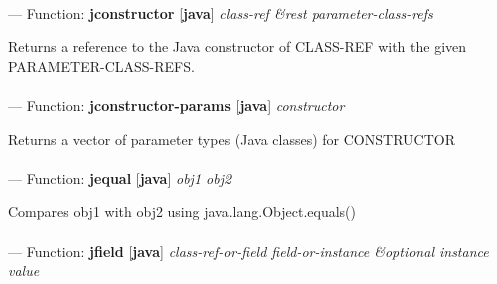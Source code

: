 \paragraph{}
\label{JAVA:JCONSTRUCTOR}
--- Function: \textbf{jconstructor} [\textbf{java}] \textit{class-ref \&rest parameter-class-refs}

\begin{adjustwidth}{5em}{5em}
Returns a reference to the Java constructor of CLASS-REF with the given PARAMETER-CLASS-REFS.
\end{adjustwidth}

\paragraph{}
\label{JAVA:JCONSTRUCTOR-PARAMS}
--- Function: \textbf{jconstructor-params} [\textbf{java}] \textit{constructor}

\begin{adjustwidth}{5em}{5em}
Returns a vector of parameter types (Java classes) for CONSTRUCTOR
\end{adjustwidth}

\paragraph{}
\label{JAVA:JEQUAL}
--- Function: \textbf{jequal} [\textbf{java}] \textit{obj1 obj2}

\begin{adjustwidth}{5em}{5em}
Compares obj1 with obj2 using java.lang.Object.equals()
\end{adjustwidth}

\paragraph{}
\label{JAVA:JFIELD}
--- Function: \textbf{jfield} [\textbf{java}] \textit{class-ref-or-field field-or-instance \&optional instance value}

